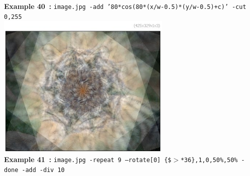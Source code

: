 \documentclass[a4paper,11pt,twoside]{book}
\begin{document}
\begin{center}
{\footnotesize \textbf{Example 40~:} \texttt{image.jpg -add '80*cos(80*(x/w-0.5)*(y/w-0.5)+c)' -cut 0,255}}
\\\includegraphics[keepaspectratio=true,height=7cm,width=\textwidth]{img/gmic_def41.jpg}\\
{\footnotesize \textbf{Example 41~:} \texttt{image.jpg -repeat 9 --rotate[0] \{\$$>$*36\},1,0,50\%,50\% -done -add -div 10}}
\end{center}
\end{document}
